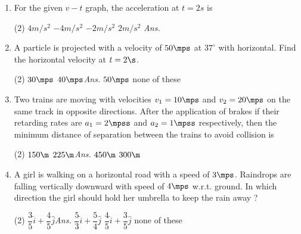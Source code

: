 \documentclass{article}
\newcommand{\ans}{\textcolor{red!95}{\textit{\quad Ans.}}}
\begin{document}
\begin{enumerate}
    \item For the given $v-t$ graph, the acceleration at $t=2s$ is
    \begin{center}
    \end{center}
    \begin{tasks}(2)
            \task $4 m/s^2$
            \task $-4 m/s^2$
            \task $-2 m/s^2$
            \task $2 m/s^2$ \ans
    \end{tasks}

\item A particle is projected with a velocity of $50\mps$ at $37^\circ$ with horizontal. Find the horizontal velocity at $t=2\s$.
\begin{center}
\end{center}
\begin{tasks}(2)
    \task $30\mps$
    \task $40\mps$\ans
    \task $50\mps$
    \task none of these
\end{tasks}




\item Two trains are moving with velocities $v_1=10\mps$ and $v_2=20\mps$ on the same track in opposite directions. After the application of brakes if their retarding rates are $a_1=2\mpss$ and $a_2=1\mpss$ respectively, then the minimum distance of separation between the trains to avoid collision is
\begin{tasks}(2)
    \task $150\m$
    \task $225\m$\ans
    \task $450\m$
    \task $300\m$
\end{tasks}


\item A girl is walking on a horizontal road with a speed of $3\mps$. Raindrops are falling vertically downward with speed of $4\mps$ w.r.t. ground. In which direction the girl should hold her umbrella to keep the rain away ?
\begin{tasks}(2)
    \task $\dfrac{3}{5}\hat{i}+\dfrac{4}{5}\hat{j}$\ans
    \task $\dfrac{5}{3}\hat{i}+\dfrac{5}{4}\hat{j}$
    \task $\dfrac{4}{5}\hat{i}+\dfrac{3}{5}\hat{j}$
    \task none of these
\end{tasks}



\end{enumerate}
\end{document}
